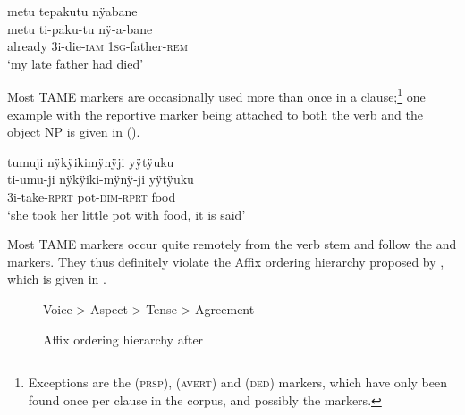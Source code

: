 \ea\label{ex:new23-deceased}
\begingl 
\glpreamble metu tepakutu nÿabane\\
\gla metu ti-paku-tu nÿ-a-bane\\ 
\glb already 3i-die-\textsc{iam} 1\textsc{sg}-father-\textsc{rem}\\ 
\glft ‘my late father had died’
\endgl
\trailingcitation{[rxx-e120511l.169]}
\xe
{}

Most TAME markers are occasionally used more than once in a clause;\footnote{Exceptions are the  (\textsc{prsp}),  (\textsc{avert}) and  (\textsc{ded}) markers, which have only been found once per clause in the corpus, and possibly the  markers.} one example with the reportive marker being attached to both the verb and the object NP is given in ().
 


\ea\label{ex:FirstTAME-2}
\begingl
\glpreamble tumuji nÿkÿikimÿnÿji yÿtÿuku\\
\gla ti-umu-ji nÿkÿiki-mÿnÿ-ji yÿtÿuku\\
\glb 3i-take-\textsc{rprt} pot-\textsc{dim}-\textsc{rprt} food\\
\glft ‘she took her little pot with food, it is said’
\endgl
\trailingcitation{[mox-n110920l.061]}
\xe

Most TAME markers occur quite remotely from the verb stem and follow the  and  markers. They thus definitely violate the Affix ordering hierarchy proposed by \citet[521]{Booij2010}, which is given in .

\begin{figure}[!ht]
\centering
Voice > Aspect > Tense > Agreement 
\caption{Affix ordering hierarchy after \citet[521]{Booij2010}}
\label{fig:AffixOrderingHierarchy}
\end{figure}

